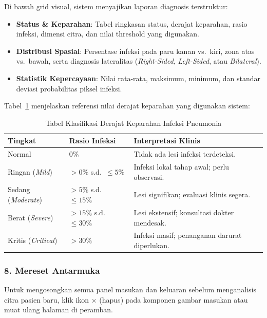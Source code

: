 \documentclass[12pt,a4paper]{article}
\begin{document}
Di bawah grid visual, sistem menyajikan laporan diagnosis terstruktur:
\begin{itemize}
    \item \textbf{Status \& Keparahan}: Tabel ringkasan status, derajat keparahan,
    rasio infeksi, dimensi citra, dan nilai threshold yang digunakan.
    \item \textbf{Distribusi Spasial}: Persentase infeksi pada paru kanan vs.\
    kiri, zona atas vs.\ bawah, serta diagnosis lateralitas (\textit{Right-Sided},
    \textit{Left-Sided}, atau \textit{Bilateral}).
    \item \textbf{Statistik Kepercayaan}: Nilai rata-rata, maksimum, minimum, dan
    standar deviasi probabilitas piksel infeksi.
\end{itemize}

Tabel~\ref{tab:severity} menjelaskan referensi nilai derajat keparahan yang
digunakan sistem:

\begin{table}[H]
\centering
\caption{Tabel Klasifikasi Derajat Keparahan Infeksi Pneumonia}
\label{tab:severity}
\begin{tabularx}{\textwidth}{l l X}
\toprule
\textbf{Tingkat}      & \textbf{Rasio Infeksi}  & \textbf{Interpretasi Klinis} \\
\midrule
Normal                & $0\%$                   & Tidak ada lesi infeksi terdeteksi. \\
Ringan (\textit{Mild})     & $>0\%$ s.d.\ $\le5\%$   & Infeksi lokal tahap awal; perlu observasi. \\
Sedang (\textit{Moderate}) & $>5\%$ s.d.\ $\le15\%$  & Lesi signifikan; evaluasi klinis segera. \\
Berat (\textit{Severe})    & $>15\%$ s.d.\ $\le30\%$ & Lesi ekstensif; konsultasi dokter mendesak. \\
Kritis (\textit{Critical}) & $>30\%$                 & Infeksi masif; penanganan darurat diperlukan. \\
\bottomrule
\end{tabularx}
\end{table}

\subsubsection{8. Mereset Antarmuka}

Untuk mengosongkan semua panel masukan dan keluaran sebelum menganalisis citra
pasien baru, klik ikon \textbf{$\times$} (hapus) pada komponen gambar masukan
atau muat ulang halaman di peramban.
\end{document}
